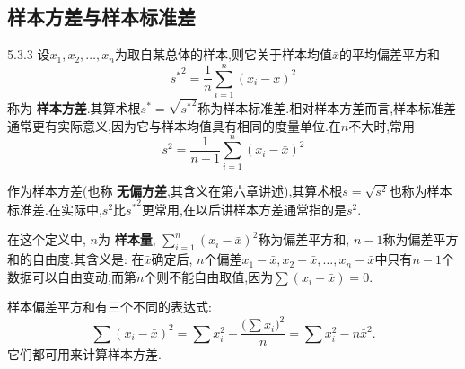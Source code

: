 \subsection{样本方差与样本标准差\label{ssec:5.3.3}}
\begin{definition}{}{5.3.3}
设$x_1,x_2,\dotsc,x_n$为取自某总体的样本,则它关于样本均值$\bar x$的平均偏差平方和
\begin{equation}\label{eq:5.3.3}
{s^\ast}^2=\frac1n\sum_{i=1}^n(x_i-\bar x)^2
\end{equation}
称为 \textbf{样本方差}.其算术根$s^\ast=\sqrt{{s^\ast}^2}$称为样本标准差.相对样本方差而言,样本标准差通常更有实际意义,因为它与样本均值具有相同的度量单位.在$n$不大时,常用
\begin{equation}\label{eq:5.3.4}
s^2=\frac1{n-1}\sum_{i=1}^n(x_i-\bar x)^2
\end{equation}

作为样本方差(也称 \textbf{无偏方差},其含义在第六章讲述),其算术根$s=\sqrt{s^2}$也称为样本标准差.在实际中,$s^2$比${s^\ast}^2$更常用,在以后讲样本方差通常指的是$s^2$.
\end{definition}

在这个定义中, $n$为 \textbf{样本量}, $\sum_{i=1}^n(x_i-\bar x)^2$称为偏差平方和, $n-1$称为偏差平方和的自由度.其含义是: 在$\bar x$确定后, $n$个偏差$x_1-\bar x,x_2-\bar x,\dotsc,x_n-\bar x$中只有$n-1$个数据可以自由变动,而第$n$个则不能自由取值,因为$\sum(x_i-\bar x)=0$.

样本偏差平方和有三个不同的表达式:
\begin{equation}\label{eq:5.3.5}
\sum(x_i-\bar x)^2=\sum x_i^2-\frac{\bigl(\sum x_i\bigr)^2}n=\sum x_i^2-n\bar x^2.
\end{equation}
它们都可用来计算样本方差.

